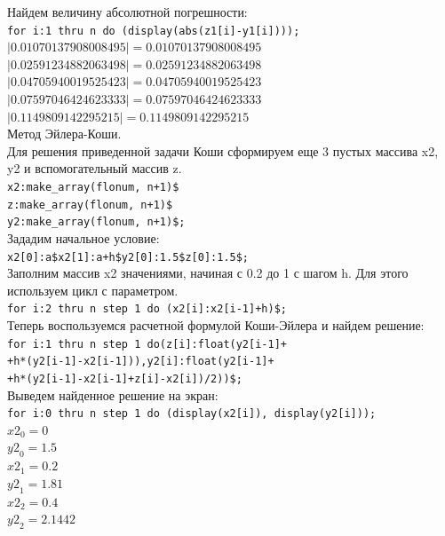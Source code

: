 \documentclass[article, bachelor, och, pract]{SCWorks}
\begin{document}
\begin{itemize}
Найдем величину абсолютной погрешности:\\
\texttt{for i:1 thru n do
(display(abs(z1[i]-y1[i])));}\\
\(\displaystyle
\left| 0.01070137908008495\right| =0.01070137908008495\)\\\(\left| 0.02591234882063498\right| =0.02591234882063498\)\\\(\left| 0.04705940019525423\right| =0.04705940019525423\)\\\(\left| 0.07597046424623333\right| =0.07597046424623333\)\\\(\left| 0.1149809142295215\right| =0.1149809142295215\mbox{}\)\\

Метод Эйлера-Коши.\\
Для решения приведенной задачи Коши сформируем еще 3 пустых массива x2, y2 и вспомогательный массив z.\\
\texttt{x2:make\_array(flonum, n+1)\$\\
z:make\_array(flonum, n+1)\$\\
y2:make\_array(flonum, n+1)\$;}\\
Зададим начальное условие:\\
\texttt{x2[0]:a\$x2[1]:a+h\$y2[0]:1.5\$z[0]:1.5\$;}\\
Заполним массив x2 значениями, начиная с 0.2 до 1 с шагом h. Для этого используем цикл с параметром.\\
\texttt{for i:2 thru n step 1 do (x2[i]:x2[i-1]+h)\$;}\\
Теперь воспользуемся расчетной формулой Коши-Эйлера и найдем решение:\\
\texttt{for i:1 thru n step 1 do(z[i]:float(y2[i-1]+\\
    +h*(y2[i-1]-x2[i-1])),y2[i]:float(y2[i-1]+\\
        +h*(y2[i-1]-x2[i-1]+z[i]-x2[i])/2))\$;}\\
Выведем найденное решение на экран:\\
\texttt{for i:0 thru n step 1 do (display(x2[i]),
display(y2[i]));}\\
\(\displaystyle
{{\mathit{x2}}_{0}}=0\)\\
\({{\mathit{y2}}_{0}}=1.5\)\\
\({{\mathit{x2}}_{1}}=0.2\)\\
\({{\mathit{y2}}_{1}}=1.81\)\\
\({{\mathit{x2}}_{2}}=0.4\)\\
\({{\mathit{y2}}_{2}}=2.1442\)\\

\end{itemize}
\end{document}
